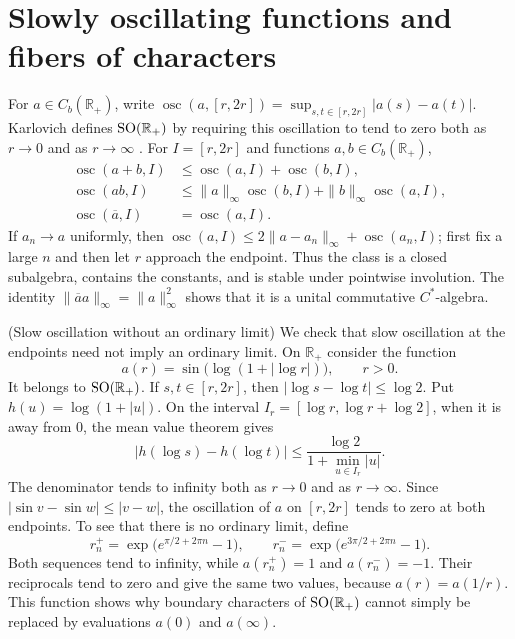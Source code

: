 \section{Slowly oscillating functions and fibers of characters}

For $a\in C_b(\mathbb R_+)$, write
$\operatorname{osc}(a,[r,2r])=\sup_{s,t\in[r,2r]}|a(s)-a(t)|$.
Karlovich defines $\operatorname{SO}(\mathbb R_+)$ by requiring this oscillation to
tend to zero both as $r\to0$ and as $r\to\infty$
\cite[§2, pp.~465--466]{Karlovich2017}. For $I=[r,2r]$ and functions
$a,b\in C_b(\mathbb R_+)$,
\[
\begin{aligned}
 \operatorname{osc}(a+b,I)&\le\operatorname{osc}(a,I)+\operatorname{osc}(b,I),\\
 \operatorname{osc}(ab,I)&\le\|a\|_\infty\operatorname{osc}(b,I)
                         +\|b\|_\infty\operatorname{osc}(a,I),\\
 \operatorname{osc}(\overline a,I)&=\operatorname{osc}(a,I).
\end{aligned}
\]
If $a_n\to a$ uniformly, then
$\operatorname{osc}(a,I)\le2\|a-a_n\|_\infty+
\operatorname{osc}(a_n,I)$; first fix a large $n$ and then let $r$
approach the endpoint. Thus the class is a closed subalgebra, contains
the constants, and is stable under pointwise involution. The identity
$\|\overline a a\|_\infty=\|a\|_\infty^2$ shows that it is a unital
commutative $C^*$-algebra.

\begin{cthejemplo}{(Slow oscillation without an ordinary limit)}
We check that slow oscillation at the endpoints need not imply an
ordinary limit. On $\mathbb R_+$ consider the function
\[
 a(r)=\sin\!\bigl(\log(1+|\log r|)\bigr),\qquad r>0.
\]
It belongs to $\operatorname{SO}(\mathbb R_+)$. If $s,t\in[r,2r]$, then
$|\log s-\log t|\le\log2$. Put $h(u)=\log(1+|u|)$.
On the interval $I_r=[\log r,\log r+\log2]$, when it is away from $0$,
the mean value theorem gives
\[
 |h(\log s)-h(\log t)|
 \le \frac{\log2}{1+\min_{u\in I_r}|u|}.
\]
The denominator tends to infinity both as $r\to0$ and as $r\to\infty$.
Since $|\sin v-\sin w|\le|v-w|$, the oscillation of $a$ on $[r,2r]$
tends to zero at both endpoints. To see that there is no ordinary
limit, define
\[
 r_n^+=\exp\!\bigl(e^{\pi/2+2\pi n}-1\bigr),\qquad
 r_n^-=\exp\!\bigl(e^{3\pi/2+2\pi n}-1\bigr).
\]
Both sequences tend to infinity, while $a(r_n^+)=1$ and $a(r_n^-)=-1$.
Their reciprocals tend to zero and give the same two values, because
$a(r)=a(1/r)$. This function shows why boundary characters of
$\operatorname{SO}(\mathbb R_+)$ cannot simply be
replaced by evaluations $a(0)$ and $a(\infty)$.
\end{cthejemplo}

